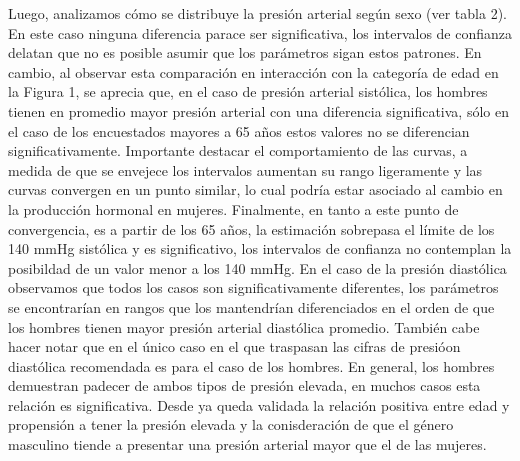 \documentclass{aa}
\begin{document}

Luego, analizamos cómo se distribuye la presión arterial según sexo (ver tabla 2). En este caso ninguna diferencia parace ser significativa, los intervalos de confianza delatan que no es posible asumir que los parámetros sigan estos patrones. En cambio, al observar esta comparación en interacción con la categoría de edad en la Figura 1, se aprecia que, en el caso de presión arterial sistólica, los hombres tienen en promedio mayor presión arterial con una diferencia significativa, sólo en el caso de los encuestados mayores a 65 años estos valores no se diferencian significativamente. Importante destacar el comportamiento de las curvas, a medida de que se envejece los intervalos aumentan su rango ligeramente y las curvas convergen en un punto similar, lo cual podría estar asociado al cambio en la producción hormonal en mujeres. Finalmente, en tanto a este punto de convergencia, es a partir de los 65 años, la estimación sobrepasa el límite de los 140 mmHg sistólica y es significativo, los intervalos de confianza no contemplan la posibildad de un valor menor a los 140 mmHg. En el caso de la presión diastólica observamos que todos los casos son significativamente diferentes, los parámetros se encontrarían en rangos que los mantendrían diferenciados en el orden de que los hombres tienen mayor presión arterial diastólica promedio. También cabe hacer notar que en el único caso en el que traspasan las cifras de presióon diastólica recomendada es para el caso de los hombres. En general, los hombres demuestran padecer de ambos tipos de presión elevada, en muchos casos esta relación es significativa. Desde ya queda validada la relación positiva entre edad y propensión a tener la presión elevada y la conisderación de que el género masculino tiende a presentar una presión arterial mayor que el de las mujeres.
\end{document}
